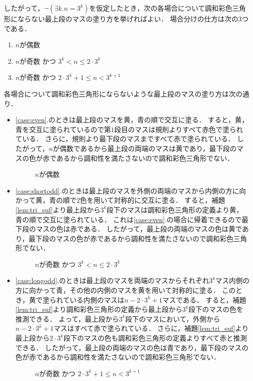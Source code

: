 したがって，$\lnot(\exists k.n=3^k)$を仮定したとき，次の各場合について調和彩色三角形にならない最上段のマスの塗り方を挙げればよい．
場合分けの仕方は次の$3$つである．
\begin{enumerate}
\item \label{case:even}
  $n$が偶数
\item \label{case:shortodd}
  $n$が奇数 かつ $3^{k} < n \leq 2 \cdot 3^{k}$
\item \label{case:longodd}
  $n$が奇数 かつ $2 \cdot 3^{k} + 1 \leq n < 3^{k+1}$
\end{enumerate}
各場合について調和彩色三角形にならないような最上段のマスの塗り方は次の通り．
\begin{itemize}
  \item
    \ref{case:even}.のときは最上段のマスを黄，青の順で交互に塗る．
    すると，黄，青を交互に塗られているので第$1$段目のマスは規則よりすべて赤色で塗られている．
    さらに，規則より最下段のマスまですべて赤で塗られている．
    したがって，$n$が偶数であるから最上段の両端のマスは黄であり，最下段のマスの色が赤であるから調和性を満たさないので調和彩色三角形でない．
    \begin{figure}[h]
      \centering
      
      \caption{$n$が偶数}
      \label{fig:even_steps}
    \end{figure}
  \item
    \ref{case:shortodd}.のときは最上段のマスを外側の両端のマスから内側の方に向かって黄，青の順で$2$色を用いて対称的に交互に塗る．
    すると，補題\ref{lem:tri_suf}より最上段から$3^k$段下のマスは調和彩色三角形の定義より黄，青の順で交互に塗られている．
    これは\ref{case:even}.の場合に帰着できるので最下段のマスの色は赤である．
    したがって，最上段の両端のマスの色は黄であり，最下段のマスの色が赤であるから調和性を満たさないので調和彩色三角形でない．
    \begin{figure}[h]
      \centering
      
      \caption{$n$が奇数 かつ $3^{k} < n \leq 2 \cdot 3^{k}$}
      \label{fig:shortodd_steps}
    \end{figure}
  \item
    \ref{case:longodd}.のときは最上段のマスを両端のマスからそれぞれ$3^k$マス内側の方に向かって青，その他の内側のマスを黄を用いて対称的に塗る．
    このとき，黄で塗られている内側のマスは$n-2\cdot3^k+1$マスである．
    すると，補題\ref{lem:tri_suf}より調和彩色三角形の定義から最上段から$3^k$段下のマスの色を推測できる．
    よって，最上段から$3^k$段下のマスにおいて，外側から$n-2\cdot3^k+1$マスはすべて赤で塗られている．
    さらに，補題\ref{lem:tri_suf}より最上段から$2\cdot3^k$段下のマスの色も調和彩色三角形の定義よりすべて赤と推測できる．
    したがって，最上段の両端のマスの色は青であり，最下段のマスの色が赤であるから調和性を満たさないので調和彩色三角形でない．
    \begin{figure}[h]
      \centering
      
      \caption{$n$が奇数 かつ $2 \cdot 3^{k} + 1 \leq n < 3^{k+1}$}
      \label{fig:longodd_steps}
    \end{figure}
\end{itemize}
\newpage

